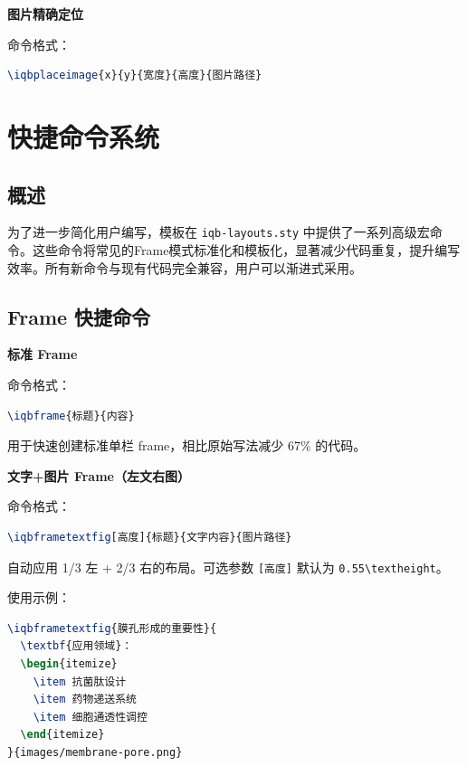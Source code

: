 \textbf{图片精确定位}

命令格式：

\begin{lstlisting}[style=blockstyle,language=TeX]
\iqbplaceimage{x}{y}{宽度}{高度}{图片路径}
\end{lstlisting}

\section{快捷命令系统}

\subsection{概述}

为了进一步简化用户编写，模板在 \lstinline|iqb-layouts.sty| 中提供了一系列高级宏命令。这些命令将常见的Frame模式标准化和模板化，显著减少代码重复，提升编写效率。所有新命令与现有代码完全兼容，用户可以渐进式采用。

\subsection{Frame 快捷命令}

\textbf{标准 Frame}

命令格式：

\begin{lstlisting}[style=blockstyle,language=TeX]
\iqbframe{标题}{内容}
\end{lstlisting}

用于快速创建标准单栏 frame，相比原始写法减少 67\% 的代码。

\textbf{文字+图片 Frame（左文右图）}

命令格式：

\begin{lstlisting}[style=blockstyle,language=TeX]
\iqbframetextfig[高度]{标题}{文字内容}{图片路径}
\end{lstlisting}

自动应用 1/3 左 + 2/3 右的布局。可选参数 \lstinline|[高度]| 默认为 \lstinline|0.55\textheight|。

使用示例：

\begin{lstlisting}[style=blockstyle,language=TeX]
\iqbframetextfig{膜孔形成的重要性}{
  \textbf{应用领域}：
  \begin{itemize}
    \item 抗菌肽设计
    \item 药物递送系统
    \item 细胞通透性调控
  \end{itemize}
}{images/membrane-pore.png}
\end{lstlisting}

